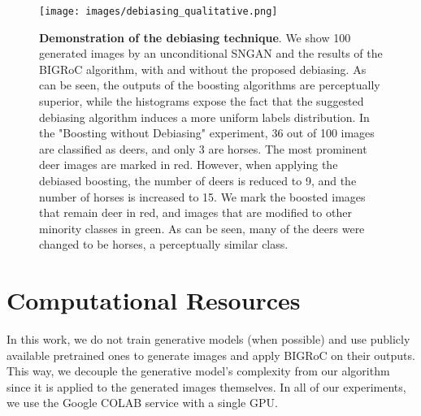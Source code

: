 \documentclass[10pt]{article} \usepackage[accepted]{tmlr}
\begin{document}
\begin{figure*}[ht]
    \centering
    \texttt{[image: images/debiasing\_qualitative.png]}
    \caption{\textbf{Demonstration of the debiasing technique}. We show 100 generated images by an unconditional SNGAN and the results of the BIGRoC algorithm, with and without the proposed debiasing.
    As can be seen, the outputs of the boosting algorithms are perceptually superior, while the histograms expose the fact that the suggested debiasing algorithm induces a more uniform labels distribution.
    In the "Boosting without Debiasing" experiment, 36 out of 100 images are classified as \textsf{deers}, and only 3 are \textsf{horses}.
    The most prominent \textsf{deer} images are marked in red.
    However, when applying the debiased boosting, the number of \textsf{deers} is reduced to 9, and the number of \textsf{horses} is increased to 15.
    We mark the boosted images that remain \textsf{deer} in red, and images that are modified to other minority classes in green.
    As can be seen, many of the \textsf{deers} were changed to be \textsf{horses}, a perceptually similar class.}
    \label{fig:debiasing}
\end{figure*}














\section{Computational Resources}

In this work, we do not train generative models (when possible) and use publicly available pretrained ones to generate images and apply BIGRoC on their outputs.
This way, we decouple the generative model's complexity from our algorithm since it is applied to the generated images themselves.
In all of our experiments, we use the Google COLAB service with a single GPU.
\end{document}
